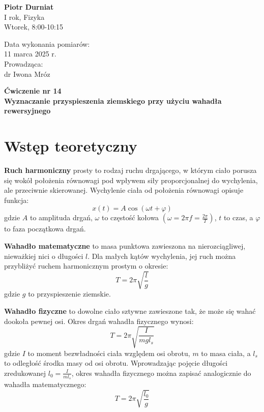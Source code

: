 \documentclass[a4paper,12pt]{article}
\begin{document}
\noindent
\begin{minipage}{0.5\textwidth}
  \raggedright
  \textbf{Piotr Durniat} \\
  I rok, Fizyka \\
  Wtorek, 8:00-10:15 \\
  \vspace{0.5cm}
  \vspace{0.5cm}
\end{minipage}%
\begin{minipage}{0.5\textwidth}
  \raggedleft
  Data wykonania pomiarów: \\
  11 marca 2025 r. \\
  \vspace{0.5cm} %
  Prowadząca: \\
  dr Iwona Mróz
\end{minipage}

\vspace{2cm} %
\begin{center}
  \LARGE \textbf{Ćwiczenie nr 14} \\[0.5cm]
  \Large \textbf{Wyznaczanie przyspieszenia ziemskiego przy użyciu wahadła rewersyjnego}
\end{center}

\vspace{1cm} %
\noindent

\section{Wstęp teoretyczny}
\textbf{Ruch harmoniczny} prosty to rodzaj ruchu drgającego, w którym ciało porusza się wokół położenia równowagi pod wpływem siły proporcjonalnej do wychylenia, ale przeciwnie skierowanej. Wychylenie ciała od położenia równowagi opisuje funkcja:
\[
  x(t) = A \cos(\omega t + \varphi)
\]
gdzie \( A \) to amplituda drgań, \( \omega \) to częstość kołowa \( \left(\omega = 2\pi f = \frac{2\pi}{T} \right) \), \( t \) to czas, a \( \varphi \) to faza początkowa drgań.

\textbf{Wahadło matematyczne} to masa punktowa zawieszona na nierozciągliwej, nieważkiej nici o długości $l$. Dla małych kątów wychylenia, jej ruch można przybliżyć ruchem harmonicznym prostym o okresie:
\[
  T = 2\pi\sqrt{\frac{l}{g}}
\]
gdzie $g$ to przyspieszenie ziemskie.

\textbf{Wahadło fizyczne} to dowolne ciało sztywne zawieszone tak, że może się wahać dookoła pewnej osi. Okres drgań wahadła fizycznego wynosi:
\[
  T = 2\pi\sqrt{\frac{I}{mgl_s}}
\]
gdzie $I$ to moment bezwładności ciała względem osi obrotu, $m$ to masa ciała, a $l_s$ to odległość środka masy od osi obrotu. Wprowadzając pojęcie długości zredukowanej $l_0 = \frac{I}{ml_s}$, okres wahadła fizycznego można zapisać analogicznie do wahadła matematycznego:
\begin{equation}
  T=2\pi\sqrt{\frac{l_0}{g}}
\end{equation}
\end{document}
